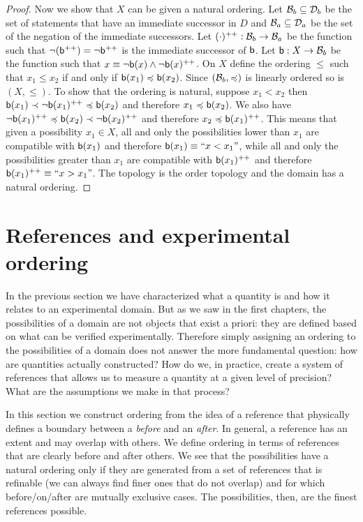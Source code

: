 \documentclass[11pt,letterpaper,fleqn]{memoir} %
\begin{document}
\begin{mathSection}
\begin{proof}
	Now we show that $X$ can be given a natural ordering. Let $\basis_b \subseteq \edomain_b$ be the set of statements that have an immediate successor in $D$ and $\basis_a \subseteq \edomain_a$ be the set of the negation of the immediate successors. Let $(\cdot)^{++} : \basis_b \to \basis_a$ be the function such that $\NOT(\stmt[b]^{++}) = \NOT \stmt[b]^{++}$ is the immediate successor of $\stmt[b]$. Let $\stmt[b] : X \to \basis_b$ be the function such that $x \equiv \NOT \stmt[b](x) \AND \NOT \stmt[b](x) ^{++}$. On $X$ define the ordering $\leq$ such that $x_1 \leq x_2$ if and only if $\stmt[b](x_1) \narrower \stmt[b](x_2)$. Since $(\basis_b, \narrower)$ is linearly ordered so is $(X, \leq)$. To show that the ordering is natural, suppose $x_1 < x_2$ then $\stmt[b](x_1) \snarrower \NOT \stmt[b](x_1) ^{++} \narrower \stmt[b](x_2)$ and therefore $x_1 \narrower \stmt[b](x_2)$. We also have $\NOT \stmt[b](x_1) ^{++} \narrower \stmt[b](x_2) \snarrower \NOT \stmt[b](x_2) ^{++}$ and therefore $x_2 \narrower \stmt[b](x_1) ^{++}$. This means that given a possibility $x_1 \in X$, all and only the possibilities lower than $x_1$ are compatible with $\stmt[b](x_1)$ and therefore $\stmt[b](x_1) \equiv ``x < x_1"$, while all and only the possibilities greater than $x_1$ are compatible with $\stmt[b](x_1)^{++}$ and therefore $\stmt[b](x_1)^{++} \equiv ``x > x_1"$. The topology is the order topology and the domain has a natural ordering.
\end{proof}

\end{mathSection}

\section{References and experimental ordering}

In the previous section we have characterized what a quantity is and how it relates to an experimental domain. But as we saw in the first chapters, the possibilities of a domain are not objects that exist a priori: they are defined based on what can be verified experimentally. Therefore simply assigning an ordering to the possibilities of a domain does not answer the more fundamental question: how are quantities actually constructed? How do we, in practice, create a system of references that allows us to measure a quantity at a given level of precision? What are the assumptions we make in that process?

In this section we construct ordering from the idea of a reference that physically defines a boundary between a \emph{before} and an \emph{after}. In general, a reference has an extent and may overlap with others. We define ordering in terms of references that are clearly before and after others. We see that the possibilities have a natural ordering only if they are generated from a set of references that is refinable (we can always find finer ones that do not overlap) and for which before/on/after are mutually exclusive cases. The possibilities, then, are the finest references possible.
\end{document}
